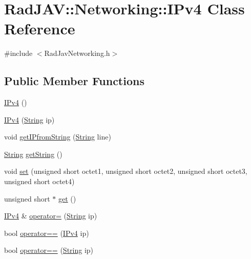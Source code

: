 \hypertarget{class_rad_j_a_v_1_1_networking_1_1_i_pv4}{}\section{Rad\+J\+AV\+:\+:Networking\+:\+:I\+Pv4 Class Reference}
\label{class_rad_j_a_v_1_1_networking_1_1_i_pv4}


{\ttfamily \#include $<$Rad\+Jav\+Networking.\+h$>$}

\subsection*{Public Member Functions}
\begin{DoxyCompactItemize}
\item 
\hyperlink{class_rad_j_a_v_1_1_networking_1_1_i_pv4_a5618bbf3d166d86ded140439fec1b82f}{I\+Pv4} ()
\item 
\hyperlink{class_rad_j_a_v_1_1_networking_1_1_i_pv4_ab139354fc0a0d28ddcae43dc53932ef3}{I\+Pv4} (\hyperlink{class_rad_j_a_v_1_1_string}{String} ip)
\item 
void \hyperlink{class_rad_j_a_v_1_1_networking_1_1_i_pv4_af1ad0c90ed3f6a590bfd7b1de617a699}{get\+I\+Pfrom\+String} (\hyperlink{class_rad_j_a_v_1_1_string}{String} line)
\item 
\hyperlink{class_rad_j_a_v_1_1_string}{String} \hyperlink{class_rad_j_a_v_1_1_networking_1_1_i_pv4_a6c418be8e5836120e69f32e051c1ca8b}{get\+String} ()
\item 
void \hyperlink{class_rad_j_a_v_1_1_networking_1_1_i_pv4_adb180130cd11789b4d2a9e3861e50357}{set} (unsigned short octet1, unsigned short octet2, unsigned short octet3, unsigned short octet4)
\item 
unsigned short $\ast$ \hyperlink{class_rad_j_a_v_1_1_networking_1_1_i_pv4_a685dcb26040092474de0f7b13f27a1ee}{get} ()
\item 
\hyperlink{class_rad_j_a_v_1_1_networking_1_1_i_pv4}{I\+Pv4} \& \hyperlink{class_rad_j_a_v_1_1_networking_1_1_i_pv4_a51d7c276754d08bdc3108eb1270e53ad}{operator=} (\hyperlink{class_rad_j_a_v_1_1_string}{String} ip)
\item 
bool \hyperlink{class_rad_j_a_v_1_1_networking_1_1_i_pv4_a09f3a2a9584caa6295f769a504c58892}{operator==} (\hyperlink{class_rad_j_a_v_1_1_networking_1_1_i_pv4}{I\+Pv4} ip)
\item 
bool \hyperlink{class_rad_j_a_v_1_1_networking_1_1_i_pv4_a7b8886f9baff97314612acda23c4e1ef}{operator==} (\hyperlink{class_rad_j_a_v_1_1_string}{String} ip)
\end{DoxyCompactItemize}
